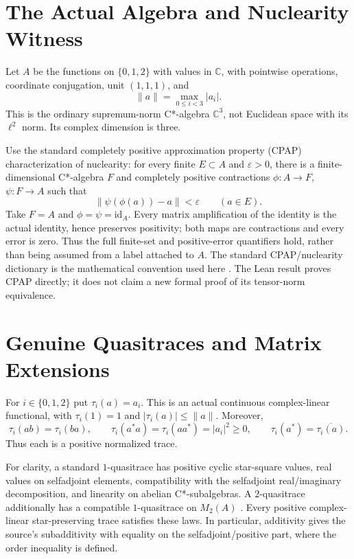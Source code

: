 \documentclass[11pt]{article}
\newcommand{\C}{\mathbb C}
\begin{document}
\section{The Actual Algebra and Nuclearity Witness}
Let $A$ be the functions on $\{0,1,2\}$ with values in $\C$, with pointwise
operations, coordinate conjugation, unit $(1,1,1)$, and
\[
 \|a\|=\max_{0\leq i<3}|a_i|.
\]
This is the ordinary supremum-norm C*-algebra $\C^3$, not Euclidean space
with its $\ell^2$ norm. Its complex dimension is three.

Use the standard completely positive approximation property (CPAP)
characterization of nuclearity: for every finite $E\subset A$ and
$\varepsilon>0$, there is a finite-dimensional C*-algebra $F$ and completely
positive contractions $\phi:A\to F$, $\psi:F\to A$ such that
\[
 \|\psi(\phi(a))-a\|<\varepsilon\qquad(a\in E).
\]
Take $F=A$ and $\phi=\psi=\mathrm{id}_A$. Every matrix amplification of
the identity is the actual identity, hence preserves positivity; both maps
are contractions and every error is zero. Thus the full finite-set and
positive-error quantifiers hold, rather than being assumed from a label
attached to $A$. The standard CPAP/nuclearity dictionary is the mathematical
convention used here \cite{CE,CT}. The Lean result proves CPAP directly; it
does not claim a new formal proof of its tensor-norm equivalence.

\section{Genuine Quasitraces and Matrix Extensions}
For $i\in\{0,1,2\}$ put $\tau_i(a)=a_i$. This is an actual continuous
complex-linear functional, with $\tau_i(1)=1$ and $|\tau_i(a)|\leq\|a\|$.
Moreover,
\[
 \tau_i(ab)=\tau_i(ba),\qquad
 \tau_i(a^*a)=\tau_i(aa^*)=|a_i|^2\geq0,\qquad
 \tau_i(a^*)=\overline{\tau_i(a)}.
\]
Thus each is a positive normalized trace.

For clarity, a standard $1$-quasitrace has positive cyclic star-square
values, real values on selfadjoint elements, compatibility with the
selfadjoint real/imaginary decomposition, and linearity on abelian
C*-subalgebras. A $2$-quasitrace additionally has a compatible $1$-quasitrace
on $M_2(A)$ \cite{H}. Every positive complex-linear star-preserving trace
satisfies these laws. In particular, additivity gives the source's
subadditivity with equality on the selfadjoint/positive part, where the
order inequality is defined.
\end{document}
